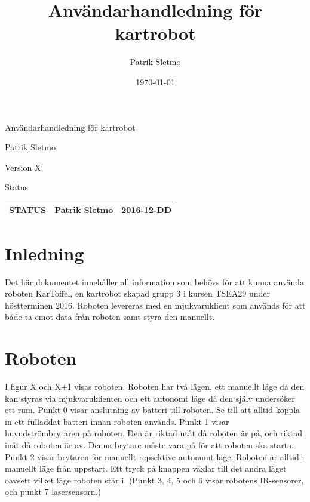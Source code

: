 \documentclass{article}
\title{Användarhandledning för kartrobot}
\author{Patrik Sletmo}
\date{\today}
\begin{document}
\thispagestyle{empty}

{
\sffamily
\centering
\large


{\huge 
Användarhandledning för kartrobot
}

{\large
Patrik Sletmo
}

{\large
Version X
}

\vspace{3.5cm}

Status
\begin{table}[H]
\centering
\begin{tabular}{ | c | c | c | }
\hline
STATUS & Patrik Sletmo & 2016-12-DD \\
\hline
\end{tabular}
\end{table}
}
\clearpage

\section{Inledning}
Det här dokumentet innehåller all information som behövs för att kunna använda roboten KarToffel, en kartrobot skapad grupp 3 i kursen TSEA29 under höstterminen 2016. Roboten levereras med en mjukvaruklient som används för att både ta emot data från roboten samt styra den manuellt. 

\section{Roboten}
I figur X och X+1 visas roboten. Roboten har två lägen, ett manuellt läge då den kan styras via mjukvaruklienten och ett autonomt läge då den själv undersöker ett rum. 
Punkt 0 visar anslutning av batteri till roboten. Se till att alltid koppla in ett fulladdat batteri innan roboten används. Punkt 1 visar huvudströmbrytaren på roboten. Den är riktad utåt då roboten är på, och riktad inåt då roboten är av. Denna brytare måste vara på för att roboten ska starta. Punkt 2 visar brytaren för manuellt repsektive autonumt läge. Roboten är alltid i manuellt läge från uppstart. Ett tryck på knappen växlar till det andra läget oavsett vilket läge roboten står i. (Punkt 3, 4, 5 och 6 visar robotens IR-sensorer, och punkt 7 lasersensorn.)
\end{document}
